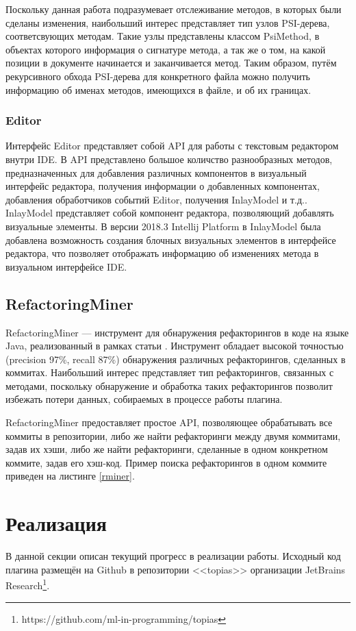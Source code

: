 \documentclass[14pt]{matmex-diploma-custom}
\begin{document}
Поскольку данная работа подразумевает отслеживание методов, в которых были сделаны изменения, наибольший интерес представляет тип узлов PSI-дерева, соответсвующих методам. Такие узлы представлены классом PsiMethod, в объектах которого информация о сигнатуре метода, а так же о том, на какой позиции в документе начинается и заканчивается метод. Таким образом, путём рекурсивного обхода PSI-дерева для конкретного файла можно получить информацию об именах методов, имеющихся в файле, и об их границах.

\subsubsection*{Editor}
Интерфейс Editor представляет собой API для работы с текстовым редактором внутри IDE. В API представлено большое количство разнообразных методов, предназначенных для добавления различных компонентов в визуальный интерфейс редактора, получения информации о добавленных компонентах, добавления обработчиков событий Editor, получения InlayModel и т.д.. InlayModel представляет собой компонент редактора, позволяющий добавлять визуальные элементы. В версии 2018.3 Intellij Platform в InlayModel была добавлена возможность создания блочных визуальных элементов в интерфейсе редактора, что позволяет отображать информацию об изменениях метода в визуальном интерфейсе IDE.

\subsection{RefactoringMiner}
RefactoringMiner --- инструмент для обнаружения рефакторингов в коде на языке Java, реализованный в рамках статьи \cite{tsantalis2018accurate}. 
Инструмент обладает высокой точностью (precision 97\%, recall 87\%) обнаружения различных  рефакторингов, сделанных в коммитах. Наибольший интерес представляет тип рефакторингов, связанных с методами, поскольку обнаружение и обработка таких рефакторингов позволит избежать потери данных, собираемых в процессе работы плагина. 

RefactoringMiner предоставляет простое API, позволяющее обрабатывать все коммиты в репозитории, либо же найти рефакторинги между двумя коммитами, задав их хэши, либо же найти рефакторинги, сделанные в одном конкретном коммите, задав его хэш-код. Пример поиска рефакторингов в одном коммите приведен на листинге \ref{rminer}.

\section{Реализация}
В данной секции описан текущий прогресс в реализации работы. Исходный код плагина размещён на Github в репозитории <<topias>> организации JetBrains Research\footnote{https://github.com/ml-in-programming/topias}. 
\end{document}
